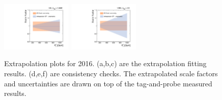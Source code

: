 \begin{figure}[!htbp]
  \includegraphics[width=0.3\textwidth]{fig/Extrapolate_2016_1_Compare.pdf}
  \includegraphics[width=0.3\textwidth]{fig/Extrapolate_2016_2_Compare.pdf}
  \caption{Extrapolation plots for 2016. (a,b,c) are the extrapolation fitting results. (d,e,f) are consistency checks. The extrapolated scale factors and uncertainties are drawn on top of the tag-and-probe measured results.}
  \label{fig:Extrapolation}
\end{figure}

